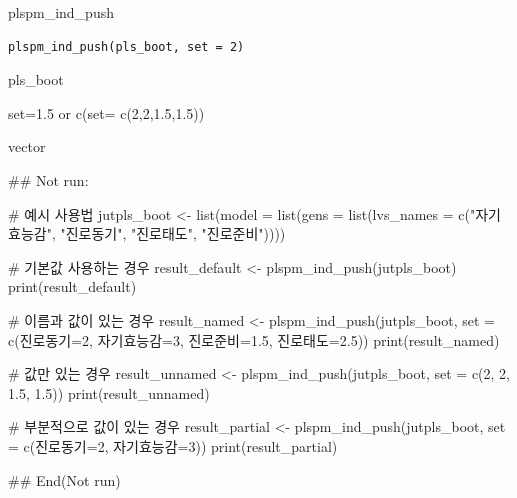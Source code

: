 \documentclass[a4paper]{book}
\begin{document}
%
\begin{Description}
plspm\_ind\_push
\end{Description}
%
\begin{Usage}
\begin{verbatim}
plspm_ind_push(pls_boot, set = 2)
\end{verbatim}
\end{Usage}
%
\begin{Arguments}
\begin{ldescription}
\item[\code{pls\_boot}] pls\_boot

\item[\code{set}] set=1.5 or c(set= c(2,2,1.5,1.5))
\end{ldescription}
\end{Arguments}
%
\begin{Value}
vector
\end{Value}
%
\begin{Examples}
\begin{ExampleCode}

\#\# Not run: 

# 예시 사용법
jutpls_boot <- list(model = list(gens = list(lvs_names = c("자기효능감", "진로동기", "진로태도", "진로준비"))))

# 기본값 사용하는 경우
result_default <- plspm_ind_push(jutpls_boot)
print(result_default)

# 이름과 값이 있는 경우
result_named <- plspm_ind_push(jutpls_boot, set = c(진로동기=2, 자기효능감=3, 진로준비=1.5, 진로태도=2.5))
print(result_named)

# 값만 있는 경우
result_unnamed <- plspm_ind_push(jutpls_boot, set = c(2, 2, 1.5, 1.5))
print(result_unnamed)

# 부분적으로 값이 있는 경우
result_partial <- plspm_ind_push(jutpls_boot, set = c(진로동기=2, 자기효능감=3))
print(result_partial)


## End(Not run)



\end{ExampleCode}
\end{Examples}
\end{document}
